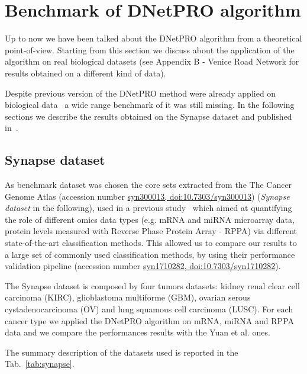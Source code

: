 \documentclass{standalone}
\begin{document}
\section[Benchmark]{Benchmark of DNetPRO algorithm}\label{benchmark}

Up to now we have been talked about the DNetPRO algorithm from a theoretical point-of-view.
Starting from this section we discuss about the application of the algorithm on real biological datasets (see Appendix B - Venice Road Network for results obtained on a different kind of data).

Despite previous version of the DNetPRO method were already applied on biological data~\cite{PMrna, Scotlandi2009, PMgene, Terragna} a wide range benchmark of it was still missing.
In the following sections we describe the results obtained on the Synapse dataset and published in~\cite{Curti2019}.

\subsection[Synapse]{Synapse dataset}\label{synapse}

As benchmark dataset was chosen the core sets extracted from the The Cancer Genome Atlas (accession number \href{https://www.synapse.org/#!Synapse:syn300013/wiki/27406}{syn300013, doi:10.7303/syn300013}) (\emph{Synapse dataset} in the following), used in a previous study~\cite{Yuan2014} which aimed at quantifying the role of different omics data types (e.g. mRNA and miRNA microarray data,  protein levels measured with Reverse Phase Protein Array - RPPA) via different state-of-the-art classification methods.
This allowed us to compare our results to a large set of commonly used classification methods, by using their performance validation pipeline (accession number \href{https://www.synapse.org/#!Synapse:syn1710282/wiki/27303}{syn1710282, doi:10.7303/syn1710282}).

The Synapse dataset is composed by four tumors datasets: kidney renal clear cell carcinoma (KIRC), glioblastoma multiforme (GBM), ovarian serous cystadenocarcinoma (OV) and lung squamous cell carcinoma (LUSC).
For each cancer type we applied the DNetPRO algorithm on mRNA, miRNA and RPPA data and we compare the performances results with the Yuan et al. ones.

The summary description of the datasets used is reported in the Tab.~\ref{tab:synapse}.
\end{document}
